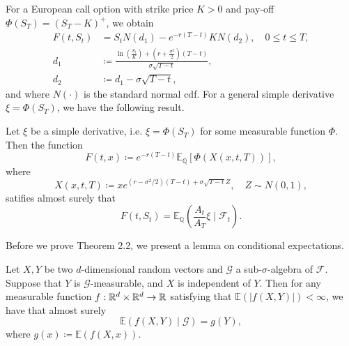 For a European call option with strike price $K>0$ and pay-off $\Phi(S_{T})=(S_{T}-K)^{+}$, we obtain
\begin{align}
    F(t,S_{t})&=S_{t}N(d_{1})-e^{-r(T-t)}KN(d_{2}),\quad 0\leq t\leq T,\\
    d_{1}&\coloneqq \frac{\ln\left(\frac{S_{t}}{K}\right)+\left(r+\frac{\sigma^{2}}{2}\right)(T-t)}{\sigma\sqrt{T-t}},\\
    d_{2}&\coloneqq d_{1}-\sigma\sqrt{T-t},
\end{align}
and where $N(\cdot)$ is the standard normal cdf. For a general simple derivative $\xi=\Phi(S_{T})$, we have the following result.
\begin{thm}
    Let $\xi$ be a simple derivative, i.e. $\xi=\Phi(S_{T})$ for some measurable function $\Phi$. Then the function
    \begin{equation}
        F(t,x)\coloneqq e^{-r(T-t)}\mathbb{E}_{\mathbb{Q}}\left[\Phi(X(x,t,T))\right],
    \end{equation}
    where 
    \begin{equation}
        X(x,t,T)\coloneqq xe^{(r-\sigma^{2}/2)(T-t)+\sigma\sqrt{T-t}Z},\quad Z\sim N(0,1),
    \end{equation}
satifies almost surely that
\begin{equation}
    F(t,S_{t})=\mathbb{E}_{\mathbb{Q}}\left(\frac{A_{t}}{A_{T}}\xi \mid \mathcal{F}_{t}\right).
\end{equation}
\end{thm}
Before we prove Theorem 2.2, we present a lemma on conditional expectations.
\begin{lem}\label{lem23}
    Let $X,Y$ be two $d$-dimensional random vectors and $\mathcal{G}$ a sub-$\sigma$-algebra of $\mathcal{F}$. Suppose that $Y$ is $\mathcal{G}$-measurable, and $X$ is independent of $Y$. Then for any measurable function $f:\mathbb{R}^{d}\times \mathbb{R}^{d}\to\mathbb{R}$ satisfying that $\mathbb{E}(|f(X,Y)|)<\infty$, we have that almost surely
    \begin{equation}
\mathbb{E}(f(X,Y)\mid \mathcal{G})=g(Y),
    \end{equation}
    where $g(x)\coloneqq \mathbb{E}(f(X,x))$.
\end{lem}

